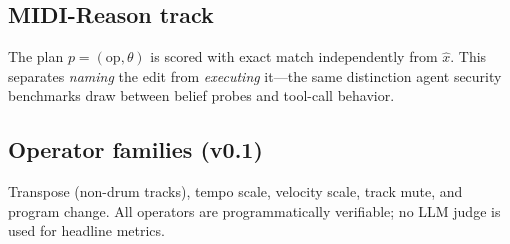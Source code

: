 \subsection{MIDI-Reason track}

The plan $p = (\text{op}, \theta)$ is scored with exact match independently from $\hat{x}$. This separates \emph{naming} the edit from \emph{executing} it---the same distinction agent security benchmarks draw between belief probes and tool-call behavior.

\subsection{Operator families (v0.1)}

Transpose (non-drum tracks), tempo scale, velocity scale, track mute, and program change. All operators are programmatically verifiable; no LLM judge is used for headline metrics.

